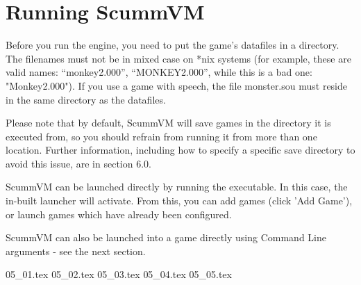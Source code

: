


\section{Running ScummVM}

Before you run the engine, you need to put the game's datafiles in a
directory. The filenames must not be in mixed case on *nix systems
(for example, these are valid names: ``monkey2.000'', ``MONKEY2.000'', while
this is a bad one: "Monkey2.000"). If you use a game with speech, the file
monster.sou must reside in the same directory as the datafiles.

Please note that by default, ScummVM will save games in the directory
it is executed from, so you should refrain from running it from more than
one location. Further information, including how to specify a specific save
directory to avoid this issue, are in section 6.0.

ScummVM can be launched directly by running the executable. In this case,
the in-built launcher will activate. From this, you can add games (click
'Add Game'), or launch games which have already been configured.

ScummVM can also be launched into a game directly using Command Line
arguments - see the next section.

 {05_01.tex}
 {05_02.tex}
 {05_03.tex}
 {05_04.tex}
 {05_05.tex}
